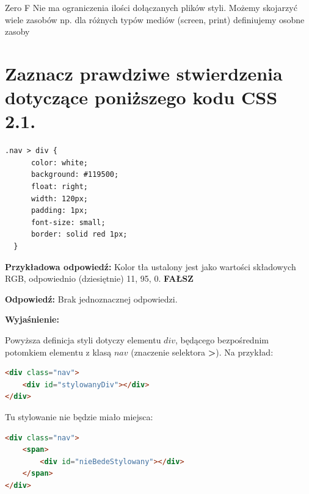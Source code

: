 {Zero}
{F}
{Nie ma ograniczenia ilości dołączanych plików styli.}
{Możemy skojarzyć wiele zasobów np. dla różnych typów mediów (screen, print) definiujemy osobne zasoby}

\section{Zaznacz prawdziwe stwierdzenia dotyczące poniższego kodu CSS 2.1.}
\begin{lstlisting}[language=html, frame=single]
  .nav > div {
      color: white;
      background: #119500;
      float: right;
      width: 120px;
      padding: 1px;
      font-size: small;
      border: solid red 1px;
  }
\end{lstlisting}

\noindent
{\textbf{Przykładowa odpowiedź:}}
Kolor tła ustalony jest jako wartości składowych RGB, odpowiednio (dziesiętnie) 11, 95, 0.
\textbf{FAŁSZ}

\vspace{0.4cm}
\noindent
\textbf{Odpowiedź:}
Brak jednoznacznej odpowiedzi.

\vspace{0.4cm}
\noindent
\textbf{Wyjaśnienie:}

\noindent
Powyższa definicja styli dotyczy elementu $div$, będącego bezpośrednim potomkiem elementu z klasą $nav$ (znaczenie selektora \textbf{>}).
Na przykład:
\begin{lstlisting}[language=html, frame=single]
<div class="nav">
    <div id="stylowanyDiv"></div>
</div>
\end{lstlisting}

\noindent
Tu stylowanie nie będzie miało miejsca:

\begin{lstlisting}[language=html, frame=single]
<div class="nav">
    <span>
        <div id="nieBedeStylowany"></div>
    </span>
</div>
\end{lstlisting}


